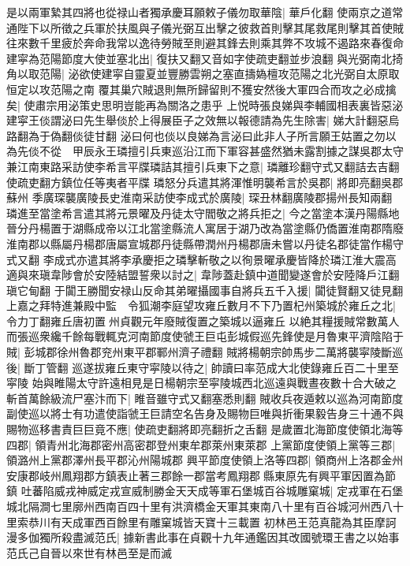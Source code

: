 是以兩軍縶其四將也從禄山者獨承慶耳願敕子儀勿取華陰|{
	華戶化翻}
使兩京之道常通陛下以所徵之兵軍於扶風與子儀光弼互出擊之彼救首則擊其尾救尾則擊其首使賊往來數千里疲於奔命我常以逸待勞賊至則避其鋒去則乘其弊不攻城不遏路來春復命建寜為范陽節度大使並塞北出|{
	復扶又翻又音如字使疏吏翻並步浪翻}
與光弼南北掎角以取范陽|{
	泌欲使建寜自靈夏並豐勝雲朔之塞直擣媯檀攻范陽之北光弼自太原取恒定以攻范陽之南}
覆其巢穴賊退則無所歸留則不獲安然後大軍四合而攻之必成擒矣|{
	使肅宗用泌策史思明豈能再為關洛之患乎}
上悦時張良娣與李輔國相表裏皆惡泌建寜王倓謂泌曰先生舉倓於上得展臣子之效無以報德請為先生除害|{
	娣大計翻惡烏路翻為于偽翻倓徒甘翻}
泌曰何也倓以良娣為言泌曰此非人子所言願王姑置之勿以為先倓不從　甲辰永王璘擅引兵東巡沿江而下軍容甚盛然猶未露割據之謀吳郡太守兼江南東路采訪使李希言平牒璘詰其擅引兵東下之意|{
	璘離珍翻守式又翻詰去吉翻使疏吏翻方鎮位任等夷者平牒}
璘怒分兵遣其將渾惟明襲希言於吳郡|{
	將即亮翻吳郡蘇州}
季廣琛襲廣陵長史淮南采訪使李成式於廣陵|{
	琛丑林翻廣陵郡揚州長知兩翻}
璘進至當塗希言遣其將元景曜及丹徒太守閻敬之將兵拒之|{
	今之當塗本漢丹陽縣地晉分丹楊置于湖縣成帝以江北當塗縣流人寓居于湖乃改為當塗縣仍僑置淮南郡隋廢淮南郡以縣屬丹楊郡唐屬宣城郡丹徒縣帶潤州丹楊郡唐未嘗以丹徒名郡徒當作楊守式又翻}
李成式亦遣其將李承慶拒之璘擊斬敬之以徇景曜承慶皆降於璘江淮大震高適與來瑱韋陟會於安陸結盟誓衆以討之|{
	韋陟蓋赴鎮中道聞變遂會於安陸降戶江翻瑱它甸翻}
于闐王勝聞安禄山反命其弟曜攝國事自將兵五千入援|{
	闐徒賢翻又徒見翻}
上嘉之拜特進兼殿中監　令狐潮李庭望攻雍丘數月不下乃置杞州築城於雍丘之北|{
	令力丁翻雍丘唐初置州貞觀元年廢賊復置之築城以逼雍丘}
以絶其糧援賊常數萬人而張巡衆纔千餘每戰輒克河南節度使虢王巨屯彭城假巡先鋒使是月魯東平濟陰陷于賊|{
	彭城郡徐州魯郡兖州東平郡鄆州濟子禮翻}
賊將楊朝宗帥馬步二萬將襲寜陵斷巡後|{
	斷丁管翻}
巡遂拔雍丘東守寜陵以待之|{
	帥讀曰率范成大北使錄雍丘百二十里至寜陵}
始與睢陽太守許遠相見是日楊朝宗至寜陵城西北巡遠與戰晝夜數十合大破之斬首萬餘級流尸塞汴而下|{
	睢音雖守式又翻塞悉則翻}
賊收兵夜遁敕以巡為河南節度副使巡以將士有功遣使詣虢王巨請空名告身及賜物巨唯與折衝果毅告身三十通不與賜物巡移書責巨巨竟不應|{
	使疏吏翻將即亮翻折之舌翻}
是歲置北海節度使領北海等四郡|{
	領青州北海郡密州高密郡登州東牟郡萊州東萊郡}
上黨節度使領上黨等三郡|{
	領潞州上黨郡澤州長平郡沁州陽城郡}
興平節度使領上洛等四郡|{
	領商州上洛郡金州安康郡岐州鳳翔郡方鎮表止著三郡餘一郡當考鳳翔郡縣東原先有興平軍因置為節鎮}
吐蕃陷威戎神威定戎宣威制勝金天天成等軍石堡城百谷城雕窠城|{
	定戎軍在石堡城北隔澗七里廓州西南百四十里有洪濟橋金天軍其東南八十里有百谷城河州西八十里索恭川有天成軍西百餘里有雕窠城皆天寶十三載置}
初林邑王范真龍為其臣摩訶漫多伽獨所殺盡滅范氏|{
	據新書此事在貞觀十九年通鑑因其改國號環王書之以始事范氏己自晉以來世有林邑至是而滅}
